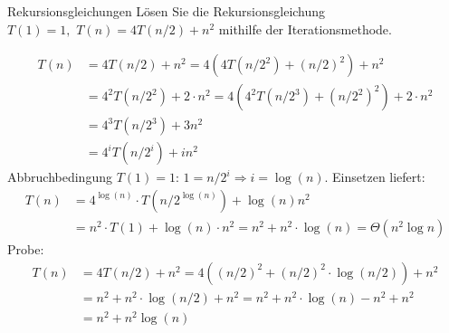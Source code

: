 \documentclass[11pt,a4paper]{article}
\begin{document}
\begin{aufgabe}{3}{Rekursionsgleichungen}
        Lösen Sie die Rekursionsgleichung $T(1) = 1, \,\, T(n) = 4T(n / 2) + n^2$ mithilfe der Iterationsmethode.
\end{aufgabe}
\begin{loesung}
    \begin{align*}
        T(n) &= 4T(n/2) + n^2 
        = 4\left(4T(n/2^2) + (n/2)^2\right) + n^2 \\
        &= 4^2 T(n / 2^2) + 2 \cdot n^2 
        = 4\left(4^2 T(n / 2^3) + (n/2^2)^2\right) + 2 \cdot n^2 \\
        &=4^3 T(n/ 2^3) + 3 n^2 \\
        &= 4^i T(n / 2^i) + i n^2
    \end{align*}
    Abbruchbedingung $T(1) = 1$: $1 = n/2^i \Rightarrow i = \log(n)$.
    Einsetzen liefert:
    \begin{align*}
        T(n) &= 4^{\log(n)} \cdot T(n / 2^{\log(n)}) + {\log(n)} n^2 \\
        &= n^2 \cdot T(1) + \log(n) \cdot n^2 = n^2 + n^2 \cdot \log(n) = \Theta(n^2 \log n)
    \end{align*}
    Probe:
    \begin{align*}
        T(n) &= 4T(n/2) + n^2 
        = 4\left((n/2)^2 + (n/2)^2 \cdot \log(n/2)\right) + n^2 \\
        &= n^2 + n^2 \cdot \log(n / 2) + n^2
        = n^2 + n^2 \cdot \log(n) - n^2 + n^2 \\
        &= n^2 + n^2 \log(n)
    \end{align*}
\end{loesung}
\end{document}
